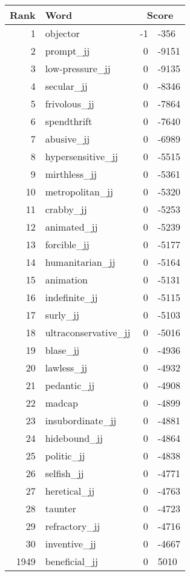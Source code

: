 \begin{longtable}[!htbp]{| rlr@{.}l |}
    \hline
    \textbf{Rank} & \textbf{Word} & \multicolumn{2}{c|}{\textbf{Score}} \\
    \hline
    \endhead
    1 & objector & -1 & -356 \\
    2 & prompt\_jj & 0 & -9151 \\
    3 & low-pressure\_jj & 0 & -9135 \\
    4 & secular\_jj & 0 & -8346 \\
    5 & frivolous\_jj & 0 & -7864 \\
    6 & spendthrift & 0 & -7640 \\
    7 & abusive\_jj & 0 & -6989 \\
    8 & hypersensitive\_jj & 0 & -5515 \\
    9 & mirthless\_jj & 0 & -5361 \\
    10 & metropolitan\_jj & 0 & -5320 \\
    11 & crabby\_jj & 0 & -5253 \\
    12 & animated\_jj & 0 & -5239 \\
    13 & forcible\_jj & 0 & -5177 \\
    14 & humanitarian\_jj & 0 & -5164 \\
    15 & animation & 0 & -5131 \\
    16 & indefinite\_jj & 0 & -5115 \\
    17 & surly\_jj & 0 & -5103 \\
    18 & ultraconservative\_jj & 0 & -5016 \\
    19 & blase\_jj & 0 & -4936 \\
    20 & lawless\_jj & 0 & -4932 \\
    21 & pedantic\_jj & 0 & -4908 \\
    22 & madcap & 0 & -4899 \\
    23 & insubordinate\_jj & 0 & -4881 \\
    24 & hidebound\_jj & 0 & -4864 \\
    25 & politic\_jj & 0 & -4838 \\
    26 & selfish\_jj & 0 & -4771 \\
    27 & heretical\_jj & 0 & -4763 \\
    28 & taunter & 0 & -4723 \\
    29 & refractory\_jj & 0 & -4716 \\
    30 & inventive\_jj & 0 & -4667 \\
    1949 & beneficial\_jj & 0 & 5010 \\

\end{longtable}
